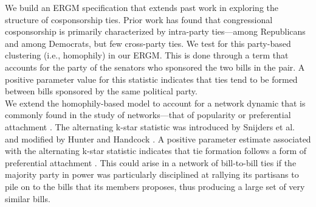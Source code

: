 \documentclass[10pt, conference, compsocconf]{IEEEtran}
\begin{document}
\indent We build an ERGM specification that extends past work \cite{zhang2008community, DesmaraisSoN} in exploring the structure of cosponsorship ties. Prior work has found that congressional cosponsorship is primarily characterized by intra-party ties---among Republicans and among Democrats, but few cross-party ties. We test for this party-based clustering (i.e., homophily) in our ERGM. This is done through a term that accounts for the party of the senators who sponsored the two bills in the pair.  A positive parameter value for this statistic indicates that ties tend to be formed between bills sponsored by the same political party.\\
\indent We extend the homophily-based model to account for a network dynamic that is commonly found in the study of networks---that of popularity or preferential attachment \cite{barabasi1999emergence}.  The alternating k-star statistic was introduced by Snijders et al. \cite{SnijdersTomA.B..2006} and modified by Hunter and Handcock  \cite{Hunter.2006}. A positive parameter estimate associated with the alternating k-star statistic indicates that tie formation follows a form of preferential attachment \cite{SnijdersTomA.B..2006}. This could arise in a network of bill-to-bill ties if the majority party in power was particularly disciplined at rallying its partisans to pile on to the bills that its members proposes, thus producing a large set of very similar bills. %
\end{document}
